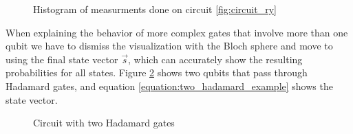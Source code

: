 \begin{figure}[!h]
    \centering
    \caption{Histogram of measurments done on circuit \ref{fig:circuit_ry}}
    \label{fig:histogram_ry}
\end{figure}

When explaining the behavior of more complex gates that involve more than one qubit we have to dismiss the visualization with the Bloch sphere and move to using the final state vector $\vec{s}$, which can accurately show the resulting probabilities for all states. Figure \ref{fig:circuit_double_hadamard} shows two qubits that pass through Hadamard gates, and equation \ref{equation:two_hadamard_example} shows the state vector.

\begin{figure}[!h]
    \centering
    \caption{Circuit with two Hadamard gates}
    \label{fig:circuit_double_hadamard}
\end{figure}

